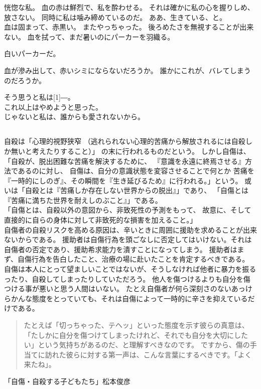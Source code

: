 \documentclass[autodetect-engine,dvipdfmx-if-dvi,a5paper,ja=standard,twoside,titlepage,final,twocolumn]{ltjtbook}
\begin{document}
恍惚な私。
血の赤は鮮烈で、私を酔わせる。
それは確かに私の心を握りしめ、放さない。
同時に私は噛み締めているのだ。
ああ、生きている、と。\\

血は固まって、赤黒い。
またやっちゃった。
後ろめたさを無視することが出来ない。
血を拭って、まだ暑いのにパーカーを羽織る。

白いパーカーだ。

血が滲み出して、赤いシミにならないだろうか。
誰かにこれが、バレてしまうのだろうか。

そう思うと私は\scalebox{3}[1]{―}。\\

これ以上はやめようと思った。\\

じゃないと私は、誰からも愛されないから。

\subsection*{}
自殺は「心理的視野狭窄
（逃れられない心理的苦痛から解放されるには自殺しか無いと考えたりすること）」
の末に行われるものだという。
しかし自傷は、「自殺が、脱出困難な苦痛を解決するために、
『意識を永遠に終焉させる』方法であるのに対し、
自傷は、自分の意識状態を変容させることで何とか
苦痛を『一時的にしのぎ』、その瞬間を『生き延びるため』に行われる。」という。
或いは「自殺とは『苦痛しか存在しない世界からの脱出』」であり、
「自傷とは『苦痛に満ちた世界を耐えしのぶこと』」である。\\

「自傷とは、自殺以外の意図から、非致死性の予測をもって、
故意に、そして直接的に自らの身体に対して非致死的な損害を加えること。」\\

自傷者の自殺リスクを高める原因は、辛いときに周囲に援助を求めることが出来ないからである。
援助者は自傷行為を頭ごなしに否定してはいけない。それは自傷者の否定であり、援助希求能力を潰すことになってしまう。
援助者はまず、自傷行為を告白したこと、治療の場に赴いたことを肯定するべきである。
自傷は本人にとって望ましいことではないが、そうしなければ他者に暴力を振るったり、自殺してしまったりしていただろう。
他人を傷つけるよりも自分を傷つける事が悪いと思う人間はいない。
たとえ自傷者が何ら深刻さのないあっけらかんな態度をとっていても、それは自傷によって一時的に辛さを抑えているだけである。
\begin{quote}
たとえば「切っちゃった、テヘッ」といった態度を示す彼らの真意は、「たしかに自分を傷つけてしまったけれど、それでも自分を大切にしたい」という気持ちがあるのだ、と理解すべきなのです。
ですから、傷の手当てに訪れた彼らに対する第一声は、こんな言葉にするべきです。「よく来たね」。
\end{quote}
「自傷・自殺する子どもたち」松本俊彦
\end{document}
